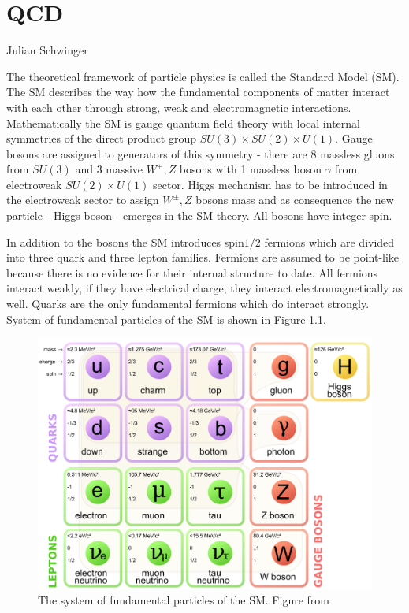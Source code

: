 \chapter{QCD}
\label{ch:qcd}

{Julian Schwinger}

The theoretical framework of particle physics is called the Standard Model (SM). The
SM describes the way how the fundamental components of matter interact with each
other through strong, weak and electromagnetic interactions. Mathematically the
SM is gauge quantum field theory with local internal symmetries of the direct
product group $SU(3) \times SU(2) \times U(1)$. Gauge bosons are assigned to
generators of this symmetry - there are 8 massless gluons from $SU(3)$ and 3
massive $W^\pm, Z$ bosons with 1 massless boson $\gamma$ from electroweak $SU(2)
\times U(1)$ sector. Higgs mechanism has to be introduced in the electroweak sector
to assign $W^\pm, Z$ bosons mass and as consequence the new particle - Higgs
boson - emerges in the SM theory. All bosons have integer spin. 

In addition to the bosons the SM introduces spin$1/2$ fermions which are
divided into three quark and three lepton families. Fermions are assumed to be
point-like because there is no evidence for their internal structure to date.
All fermions interact weakly, if they have electrical charge, they interact
electromagnetically as well. Quarks are the only fundamental fermions which do
interact strongly. System of fundamental particles of the SM is shown in Figure
\ref{fig:SMparticles}. 

\begin{figure}[!ht]
  \centering
  \includegraphics[width=\textwidth]{Chapter1/SM.png} 
  \caption{The system of fundamental particles of the SM. Figure from
    \cite{wiki:SMParticlesSource}}
  \label{fig:SMparticles}
\end{figure}

